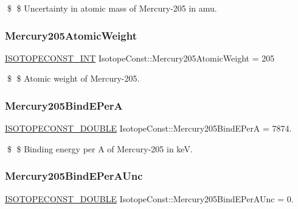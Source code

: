 \$ \$ Uncertainty in atomic mass of Mercury-\/205 in amu. \mbox{\label{group___isotope_const-_mercury-_hg205_ga1957f01aef92f26ce5fc0a11622b7a8f}} 
\subsubsection{\texorpdfstring{Mercury205\+Atomic\+Weight}{Mercury205AtomicWeight}}
{\footnotesize\ttfamily \mbox{\hyperlink{group___isotope_const-_macros_ga5f18360b3e99483a35c32d789e62621c}{I\+S\+O\+T\+O\+P\+E\+C\+O\+N\+S\+T\+\_\+\+I\+NT}} Isotope\+Const\+::\+Mercury205\+Atomic\+Weight = 205}

\$ \$ Atomic weight of Mercury-\/205. \mbox{\label{group___isotope_const-_mercury-_hg205_gaa7e750a168034baa70bb6abfe22d8cf1}} 
\subsubsection{\texorpdfstring{Mercury205\+Bind\+E\+PerA}{Mercury205BindEPerA}}
{\footnotesize\ttfamily \mbox{\hyperlink{group___isotope_const-_macros_ga8f45a7272ce02c0b4c65c44636ed719a}{I\+S\+O\+T\+O\+P\+E\+C\+O\+N\+S\+T\+\_\+\+D\+O\+U\+B\+LE}} Isotope\+Const\+::\+Mercury205\+Bind\+E\+PerA = 7874.}

\$ \$ Binding energy per A of Mercury-\/205 in keV. \mbox{\label{group___isotope_const-_mercury-_hg205_ga2c7c990fabe23a263e8aa45806b03800}} 
\subsubsection{\texorpdfstring{Mercury205\+Bind\+E\+Per\+A\+Unc}{Mercury205BindEPerAUnc}}
{\footnotesize\ttfamily \mbox{\hyperlink{group___isotope_const-_macros_ga8f45a7272ce02c0b4c65c44636ed719a}{I\+S\+O\+T\+O\+P\+E\+C\+O\+N\+S\+T\+\_\+\+D\+O\+U\+B\+LE}} Isotope\+Const\+::\+Mercury205\+Bind\+E\+Per\+A\+Unc = 0.}

